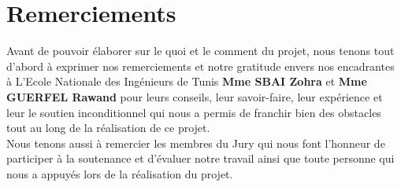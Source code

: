 \chapter*{Remerciements}

    Avant de pouvoir élaborer sur le quoi et le comment du projet, nous tenons tout d’abord à exprimer nos remerciements et notre gratitude envers nos encadrantes à L’Ecole Nationale des Ingénieurs de Tunis  \textbf{Mme SBAI Zohra} et \textbf{Mme GUERFEL Rawand} pour leurs conseils, leur savoir-faire, leur expérience et leur le soutien inconditionnel qui nous a permis de franchir bien des obstacles tout au long de la réalisation de ce projet.\\
    Nous tenons aussi à remercier les membres du Jury qui nous font l’honneur de participer à la soutenance et d’évaluer notre travail ainsi que toute personne qui nous a appuyés lors de la réalisation du projet.






